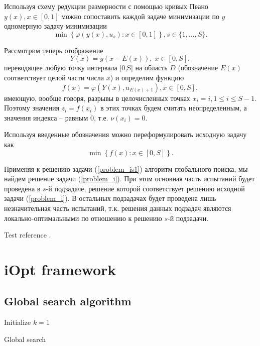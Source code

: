 \documentclass[preprint,12pt]{elsarticle}
\begin{document}
Используя схему редукции размерности с помощью кривых Пеано $y(x), x\in [0,1]$ можно сопоставить каждой задаче минимизации по $y$ одномерную задачу минимизации
\[
 \min{\left\{ \varphi(y(x),u_s): x \in [0,1] \right\}}, s \in \{1,...,S\}.
\]

Рассмотрим теперь отображение 
\[
Y(x)=y(x-E(x)), \; x\in[0,S],
\]
переводящее любую точку интервала [0,S] на область $D$ (обозначение $E(x)$ соответствует целой части числа $x$) и определим функцию 
\[
f(x) = \varphi(Y(x),u_{E(x)+1}), x\in[0,S],
\]
имеющую, вообще говоря, разрывы в целочисленных точках $x_i = i, 1\leq i \leq S-1$.
Поэтому значения  $z_i = f(x_i)$ в этих точках будем считать неопределенным, а значения индекса -- равным 0, т.е. $\nu(x_i) = 0$.

Используя введенные обозначения можно переформулировать исходную задачу как
\begin{equation}\label{problem_is1}
\min \left\{f(x): x \in [0,S] \right\}.
\end{equation}

Применяя к решению задачи (\ref{problem_is1}) алгоритм глобального поиска, мы найдем решение задачи (\ref{problem_i}). При этом основная часть испытаний будет проведена в $s$-й подзадаче, решение которой соответствует решению исходной задачи (\ref{problem_i}). В остальных подзадачах будет проведена лишь незначительная часть испытаний, т.к. решения данных подзадач являются локально-оптимальными по отношению к решению $s$-й подзадачи.


Test reference \cite{Strongin2000,Barkalov2021}.


\section{iOpt framework} 
\label{sec_iOpt}

\subsection{Global search algorithm}
\label{sec_GSA}

\begin{algorithm}[H]
\LinesNumbered
 Initialize $k=1$\\
 \caption{Global search}
\end{algorithm}
\end{document}
